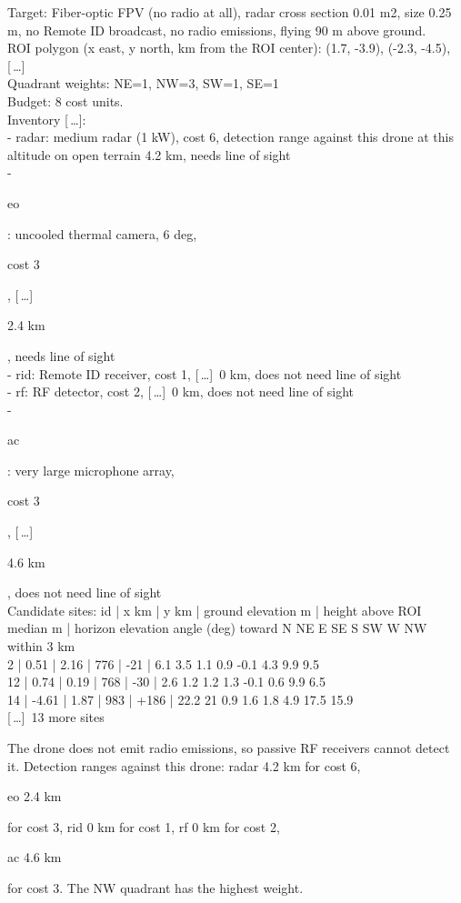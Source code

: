 \documentclass[border=1pt]{standalone}
\newcommand{\hl}[2]{{\setlength{\fboxsep}{0.6pt}\colorbox{#1}{\strut #2}}}
\newcommand{\om}{{\color{ob!70}[\,\dots]}}
\begin{document}
\frenchspacing
\begin{minipage}{7.16in}
\begin{minipage}[t]{0.492\linewidth}\vspace{0pt}
\begin{tcolorbox}[colback=white, colframe=ob, title={Observation (abridged), names inventory}, height=2.4in]
Target: Fiber-optic FPV (no radio at all), radar cross section 0.01 m2, size 0.25 m, no Remote ID broadcast, no radio emissions, flying 90 m above ground.\\[1pt]
ROI polygon (x east, y north, km from the ROI center): (1.7, -3.9), (-2.3, -4.5), \om\\[1pt]
Quadrant weights: NE=1, NW=3, SW=1, SE=1\\[1pt]
Budget: 8 cost units.\\[1pt]
Inventory \om:\\
- radar: medium radar (1 kW), cost 6, detection range against this drone at this altitude on open terrain 4.2 km, needs line of sight\\
- \hl{hlE}{eo}: uncooled thermal camera, 6 deg, \hl{hlE}{cost 3}, \om\ \hl{hlE}{2.4 km}, needs line of sight\\
- rid: Remote ID receiver, cost 1, \om\ 0 km, does not need line of sight\\
- rf: RF detector, cost 2, \om\ 0 km, does not need line of sight\\
- \hl{hlA}{ac}: very large microphone array, \hl{hlA}{cost 3}, \om\ \hl{hlA}{4.6 km}, does not need line of sight\\[1pt]
Candidate sites: id | x km | y km | ground elevation m | height above ROI median m | horizon elevation angle (deg) toward N NE E SE S SW W NW within 3 km\\
2 | 0.51 | 2.16 | 776 | -21 | 6.1 3.5 1.1 0.9 -0.1 4.3 9.9 9.5\\
12 | 0.74 | 0.19 | 768 | -30 | 2.6 1.2 1.2 1.3 -0.1 0.6 9.9 6.5\\
14 | -4.61 | 1.87 | 983 | +186 | 22.2 21 0.9 1.6 1.8 4.9 17.5 15.9\\
\om\ 13 more sites
\end{tcolorbox}
\end{minipage}\hfill
\begin{minipage}[t]{0.492\linewidth}\vspace{0pt}
\begin{tcolorbox}[colback=nm!4, colframe=nm, title={Trained 7B, names inventory \hfill QR = 0.44}]
The drone does not emit radio emissions, so passive RF receivers cannot detect it. Detection ranges against this drone: radar 4.2 km for cost 6, \hl{hlE}{eo 2.4 km} for cost 3, rid 0 km for cost 1, rf 0 km for cost 2, \hl{hlA}{ac 4.6 km} for cost 3. The NW quadrant has the highest weight.\\[1pt]

\end{tcolorbox}
\end{minipage}
\end{minipage}
\end{document}
